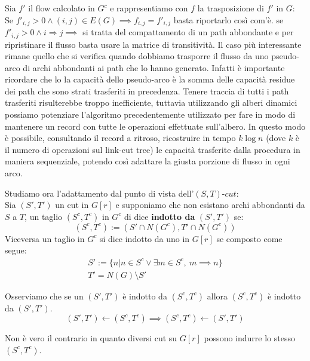Sia $f'$ il flow calcolato in $G^c$ e rappresentiamo con $f$ la trasposizione di $f'$ in $G$:\\
Se $f'_{i,j}> 0\land (i,j) \in E(G)\implies f_{i,j} = f'_{i,j}$ basta riportarlo così com'è.
se $f'_{i,j}> 0\land i \Rightarrow j \implies$ si tratta del compattamento di un path abbondante e per ripristinare il flusso basta usare la matrice di transitività.
Il caso più interessante rimane quello che si verifica quando dobbiamo trasporre il flusso da uno pseudo-arco di archi abbondanti ai path che lo hanno generato.
Infatti è importante ricordare che lo la capacità dello pseudo-arco è la somma delle capacità residue dei path che sono strati trasferiti in precedenza.
Tenere traccia di tutti i path trasferiti risulterebbe troppo inefficiente, tuttavia utilizzando gli alberi dinamici possiamo potenziare l'algoritmo precedentemente utilizzato per fare in modo di mantenere un record con tutte le operazioni effettuate sull'albero.
In questo modo è possibile, consultando il record a ritroso, ricostruire in tempo $k\log n$ (dove $k$ è  il numero di operazioni sul link-cut tree) le capacità trasferite dalla procedura in maniera sequenziale, potendo così adattare la giusta porzione di flusso in ogni arco.

Studiamo ora l'adattamento dal punto di vista dell'$(S,T)$-$cut$:\\
Sia $(S',T')$ un cut in $G[r]$ e supponiamo che non esistano archi abbondanti da $S$ a $T$,
un taglio $(S^c,T^c)$ in $G^c$ di dice \textbf{indotto da}  $(S',T')$ se: \[(S^c, T^c) := (S'\cap N(G^c), T'\cap N(G^c))\]
Viceversa un taglio in $G^c$ si dice indotto da uno in $G[r]$ se composto come segue:
\[\begin{array}{l}
    S':=\{n | n\in S^c\lor \exists m \in S^c,\ m \implies n\}\\
    T' = N(G)\setminus S'
\end{array}\]

\begin{obs}{}{}
    Osserviamo che se un $(S',T')$ è indotto da  $(S^c,T^c)$ allora  $(S^c,T^c)$ è indotto da $(S',T')$.
        \[(S',T')\leftarrow(S^c,T^c)\implies (S^c,T^c)\leftarrow(S',T')\]

    Non è vero il contrario in quanto diversi cut su $G[r]$ possono indurre lo stesso $(S^c,T^c)$.
\end{obs}


